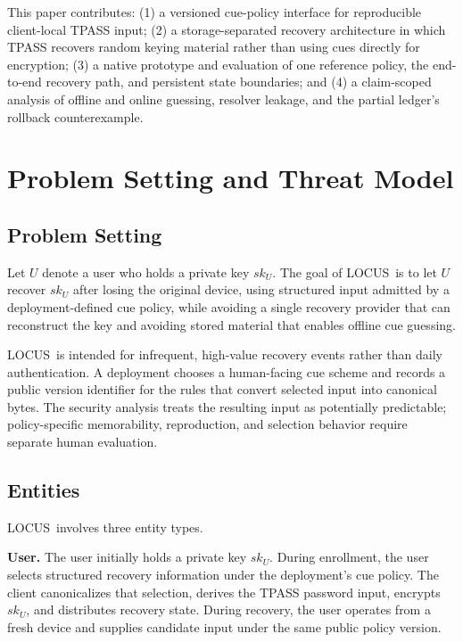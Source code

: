 \documentclass[sigconf,anonymous]{acmart}
\newcommand{\LOCUS}{\textsf{LOCUS}}
\begin{document}
This paper contributes: (1) a versioned cue-policy interface for reproducible client-local TPASS input; (2) a storage-separated recovery architecture in which TPASS recovers random keying material rather than using cues directly for encryption; (3) a native prototype and evaluation of one reference policy, the end-to-end recovery path, and persistent state boundaries; and (4) a claim-scoped analysis of offline and online guessing, resolver leakage, and the partial ledger's rollback counterexample.

\section{Problem Setting and Threat Model}
\label{sec:problem}

\subsection{Problem Setting}

Let \(U\) denote a user who holds a private key \(sk_U\). The goal of \LOCUS\ is to let \(U\) recover \(sk_U\) after losing the original device, using structured input admitted by a deployment-defined cue policy, while avoiding a single recovery provider that can reconstruct the key and avoiding stored material that enables offline cue guessing.

\LOCUS\ is intended for infrequent, high-value recovery events rather than daily authentication. A deployment chooses a human-facing cue scheme and records a public version identifier for the rules that convert selected input into canonical bytes. The security analysis treats the resulting input as potentially predictable; policy-specific memorability, reproduction, and selection behavior require separate human evaluation.

\subsection{Entities}

\LOCUS\ involves three entity types.

\textbf{User.}
The user initially holds a private key \(sk_U\). During enrollment, the user selects structured recovery information under the deployment's cue policy. The client canonicalizes that selection, derives the TPASS password input, encrypts \(sk_U\), and distributes recovery state. During recovery, the user operates from a fresh device and supplies candidate input under the same public policy version.
\end{document}
